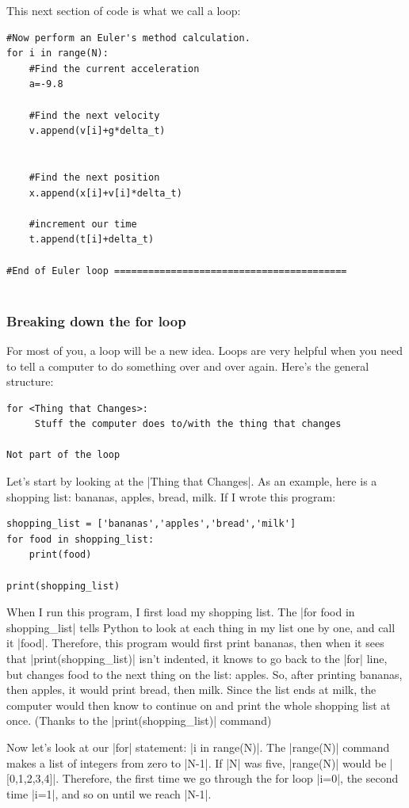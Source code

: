\documentclass[twoside,11pt,ShortChapTitles]{BYUTextbook}
\begin{document}
This next section of code is what we call a loop:
\begin{lstlisting}
#Now perform an Euler's method calculation.
for i in range(N):
    #Find the current acceleration
    a=-9.8
    
    #Find the next velocity
    v.append(v[i]+g*delta_t)    
    
    
    #Find the next position
    x.append(x[i]+v[i]*delta_t)
    
    #increment our time
    t.append(t[i]+delta_t)

#End of Euler loop =========================================


\end{lstlisting}

\subsubsection{Breaking down the for loop}
For most of you, a loop will be a new idea. Loops are very helpful when you need to tell a computer to do something over and over again.  Here's the general structure:
\begin{lstlisting}
for <Thing that Changes>:
     Stuff the computer does to/with the thing that changes

Not part of the loop
\end{lstlisting}

Let's start by looking at the |Thing that Changes|.   As an example, here is a shopping list: bananas, apples, bread, milk.  If I wrote this program:
\begin{lstlisting}
shopping_list = ['bananas','apples','bread','milk']
for food in shopping_list:
    print(food)

print(shopping_list)
\end{lstlisting}
When I run this program, I first load my shopping list.  The |for food in shopping_list| tells Python to look at each thing in my list one by one, and call it |food|.  Therefore, this program would first print bananas, then when it sees that |print(shopping_list)| isn't indented, it knows to go back to the |for| line, but changes food to the next thing on the list: apples.  So, after printing bananas, then apples, it would print bread, then milk.  Since the list ends at milk, the computer would then know to continue on and print the whole shopping list at once. (Thanks to the |print(shopping_list)| command)

Now let's look at our |for| statement: |i in range(N)|.  The |range(N)| command makes a list of integers from zero to |N-1|.  If |N| was five, |range(N)| would be |[0,1,2,3,4]|.  Therefore, the first time we go through the for loop |i=0|, the second time |i=1|, and so on until we reach |N-1|.
\end{document}
